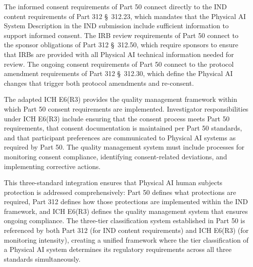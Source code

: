 The informed consent requirements of Part 50 connect directly to the IND
content requirements of Part 312 \S~312.23, which mandates that the Physical
AI System Description in the IND submission include sufficient information to
support informed consent. The IRB review requirements of Part 50 connect to the
sponsor obligations of Part 312 \S~312.50, which require sponsors to ensure
that IRBs are provided with all Physical AI technical information needed for
review. The ongoing consent requirements of Part 50 connect to the protocol
amendment requirements of Part 312 \S~312.30, which define the Physical AI
changes that trigger both protocol amendments and re-consent.

The adapted ICH E6(R3) \cite{ich-adapt} provides the quality management
framework within which Part 50 consent requirements are implemented.
Investigator responsibilities under ICH E6(R3) include ensuring that the
consent process meets Part 50 requirements, that consent documentation is
maintained per Part 50 standards, and that participant preferences are
communicated to Physical AI systems as required by Part 50. The quality
management system must include processes for monitoring consent compliance,
identifying consent-related deviations, and implementing corrective actions.

This three-standard integration ensures that Physical AI human subjects
protection is addressed comprehensively: Part 50 defines what protections are
required, Part 312 defines how those protections are implemented within the IND
framework, and ICH E6(R3) defines the quality management system that ensures
ongoing compliance. The three-tier classification system established in Part 50
is referenced by both Part 312 (for IND content requirements) and ICH E6(R3)
(for monitoring intensity), creating a unified framework where the tier
classification of a Physical AI system determines its regulatory requirements
across all three standards simultaneously.
